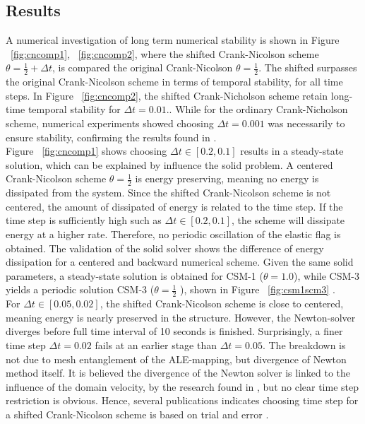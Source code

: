 \subsection{Results}
A numerical investigation of long term numerical stability is shown in Figure ~\ref{fig:cncomp1}, ~\ref{fig:cncomp2}, where the shifted Crank-Nicolson scheme $\theta = \frac{1}{2} + \Delta t$, is compared the original Crank-Nicolson $\theta = \frac{1}{2}$. The shifted surpasses the original Crank-Nicolson scheme in terms of temporal stability, for all time steps. In Figure ~\ref{fig:cncomp2}, the shifted Crank-Nicholson scheme retain long-time temporal stability for  $\Delta t = 0.01$.. While for the ordinary Crank-Nicholson scheme, numerical experiments showed choosing $\Delta t = 0.001$ was necessarily to ensure stability, confirming the results found in \cite{Wicka}.  \\
Figure ~\ref{fig:cncomp1} shows choosing $\Delta t \in [0.2, 0.1]$ results in a steady-state solution, which can be explained by influence the solid problem. A centered Crank-Nicolson scheme $\theta= \frac{1}{2}$ is energy preserving, meaning no energy is dissipated from the system. Since the shifted Crank-Nicolson scheme is not centered, the amount of dissipated of energy is related to the time step. If the time step is sufficiently high such as $\Delta t \in [0.2, 0.1]$, the scheme will dissipate energy at a higher rate. Therefore, no periodic oscillation of the elastic flag is obtained. The validation of the solid solver shows the difference of energy dissipation for a centered and backward numerical scheme. Given the same solid parameters, a steady-state solution is obtained for CSM-1 ($\theta = 1.0 $), while CSM-3 yields a periodic solution CSM-3 ($\theta = \frac{1}{2}$ ), shown in Figure ~\ref{fig:csm1scm3} .\\
For $\Delta t \in [0.05, 0.02]$, the shifted Crank-Nicolson scheme is close to centered, meaning energy is nearly preserved in the structure. However, the Newton-solver diverges before full time interval of 10 seconds is finished. Surprisingly, a finer time step $\Delta t = 0.02$ fails at an earlier stage than $\Delta t = 0.05$. The breakdown is not due to mesh entanglement of the ALE-mapping, but divergence of Newton method itself\cite{Richter2015}. It is believed the divergence of the Newton solver is linked to the influence of the domain velocity, by the research found in \cite{Formaggia2004}, but no clear time step restriction is obvious. Hence, several publications indicates choosing time step for a shifted Crank-Nicolson scheme is based on trial and error \cite{Wicka, Wick2013a}. 
